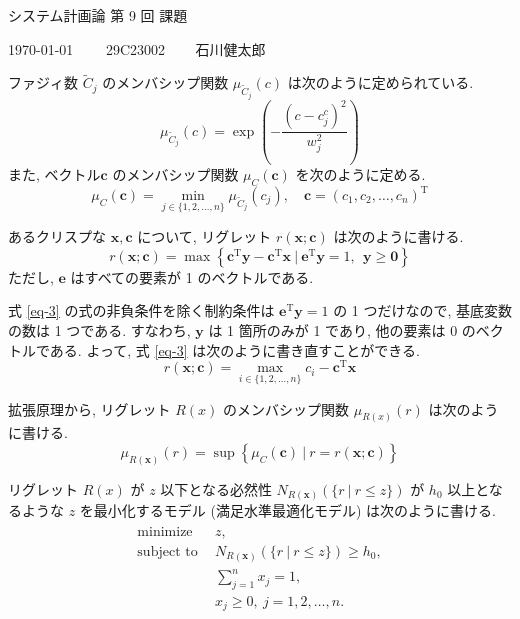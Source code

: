 \documentclass[uplatex, a4j, 11pt, fleqn, dvipdfmx]{article}
\begin{document}
\begin{center}
	{\Huge システム計画論 第 9 回 課題}
\end{center}

\begin{flushright}
	{\Large \today ~~~~ 29C23002 ~~~ 石川健太郎}
\end{flushright}


ファジィ数 $\tilde{C}_j$ のメンバシップ関数 $\mu_{\tilde{C}_j} (c)$ は次のように定められている.
\begin{equation}
	\mu_{\tilde{C}_j} (c)  = \exp \left( - \frac{( c - c_j^c )^2}{w_j^2} \right)
	\label{eq-1}
\end{equation}
また, ベクトル$\bm{c}$ のメンバシップ関数 $\mu_{C} (\bm{c})$ を次のように定める.
\begin{equation}
	\mu_{C} (\bm{c}) = \min_{j \in \{1,2,\dots,n\}} \mu_{\tilde{C}_j} (c_j), \quad
	\bm{c} = \left( c_1, c_2, \dots, c_n \right)^\mathrm{T}
	\label{eq-2}
\end{equation}

あるクリスプな $\bm{x}, \bm{c}$ について, リグレット $r(\bm{x}; \bm{c})$ は次のように書ける.
\begin{equation}
	r(\bm{x}; \bm{c}) = \max \left\{ \bm{c}^\mathrm{T} \bm{y} -  \bm{c}^\mathrm{T} \bm{x} ~ | ~ \bm{e}^\mathrm{T} \bm{y} = 1, ~~ \bm{y} \geq \bm{0} \right\}
	\label{eq-3}
\end{equation}
ただし, $\bm{e}$ はすべての要素が 1 のベクトルである.

式 \eqref{eq-3} の式の非負条件を除く制約条件は $\bm{e}^\mathrm{T} \bm{y} = 1$ の 1 つだけなので, 基底変数の数は 1 つである.
すなわち, $\bm{y}$ は 1 箇所のみが 1 であり, 他の要素は 0 のベクトルである.
よって, 式 \eqref{eq-3} は次のように書き直すことができる.
\begin{equation}
	r(\bm{x}; \bm{c}) = \max_{i \in \{1,2,\dots,n\}} c_i  - \bm{c}^\mathrm{T} \bm{x}
	\label{eq-4}
\end{equation}

拡張原理から, リグレット $R(x)$ のメンバシップ関数 $\mu_{R(x)}(r)$ は次のように書ける.
\begin{equation}
	\mu_{R(\bm{x})}(r) = \sup \left\{ \mu_{C} (\bm{c}) ~ | ~ r = r(\bm{x}; \bm{c}) \right\}
	\label{eq-5}
\end{equation}

リグレット $R(x)$ が $z$ 以下となる必然性 $N_{R({\bm{x}})}\left( \{ r ~ | ~ r \leq z \} \right)$ が $h_0$ 以上となるような $z$ を最小化するモデル (満足水準最適化モデル) は次のように書ける.
\begin{align}
	\begin{aligned}
		\text{minimize} ~   & ~ z,                                                             \\
		\text{subject to} ~ & ~ N_{R({\bm{x}})}\left( \{ r ~ | ~ r \leq z \} \right) \geq h_0, \\
		                    & ~ \sum_{j = 1}^{n} x_j = 1,                                      \\
		                    & ~ x_j \geq 0, ~ j = 1, 2, \dots, n.
	\end{aligned}
	\label{eq-6}
\end{align}
\end{document}
